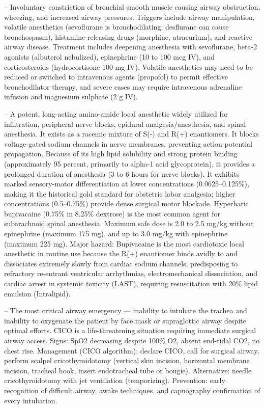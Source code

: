 -- Involuntary constriction of bronchial smooth muscle causing airway obstruction, wheezing, and increased airway pressures. Triggers include airway manipulation, volatile anesthetics (sevoflurane is bronchodilating; desflurane can cause bronchospasm), histamine-releasing drugs (morphine, atracurium), and reactive airway disease. Treatment includes deepening anesthesia with sevoflurane, beta-2 agonists (albuterol nebulized), epinephrine (10 to 100 mcg IV), and corticosteroids (hydrocortisone 100 mg IV). Volatile anesthetics may need to be reduced or switched to intravenous agents (propofol) to permit effective bronchodilator therapy, and severe cases may require intravenous adrenaline infusion and magnesium sulphate (2 g IV).

-- A potent, long-acting amino-amide local anesthetic widely utilized for infiltration, peripheral nerve blocks, epidural analgesia/anesthesia, and spinal anesthesia. It exists as a racemic mixture of S(-) and R(+) enantiomers. It blocks voltage-gated sodium channels in nerve membranes, preventing action potential propagation. Because of its high lipid solubility and strong protein binding (approximately 95 percent, primarily to alpha-1 acid glycoprotein), it provides a prolonged duration of anesthesia (3 to 6 hours for nerve blocks). It exhibits marked sensory-motor differentiation at lower concentrations (0.0625--0.125\%), making it the historical gold standard for obstetric labor analgesia; higher concentrations (0.5--0.75\%) provide dense surgical motor blockade. Hyperbaric bupivacaine (0.75\% in 8.25\% dextrose) is the most common agent for subarachnoid spinal anesthesia. Maximum safe dose is 2.0 to 2.5 mg/kg without epinephrine (maximum 175 mg), and up to 3.0 mg/kg with epinephrine (maximum 225 mg). Major hazard: Bupivacaine is the most cardiotoxic local anesthetic in routine use because the R(+) enantiomer binds avidly to and dissociates extremely slowly from cardiac sodium channels, predisposing to refractory re-entrant ventricular arrhythmias, electromechanical dissociation, and cardiac arrest in systemic toxicity (LAST), requiring resuscitation with 20\% lipid emulsion (Intralipid).

-- The most critical airway emergency — inability to intubate the trachea and inability to oxygenate the patient by face mask or supraglottic airway despite optimal efforts. CICO is a life-threatening situation requiring immediate surgical airway access. Signs: SpO2 decreasing despite 100\% O2, absent end-tidal CO2, no chest rise. Management (CICO algorithm): declare CICO, call for surgical airway, perform scalpel cricothyroidotomy (vertical skin incision, horizontal membrane incision, tracheal hook, insert endotracheal tube or bougie). Alternative: needle cricothyroidotomy with jet ventilation (temporizing). Prevention: early recognition of difficult airway, awake techniques, and capnography confirmation of every intubation.

